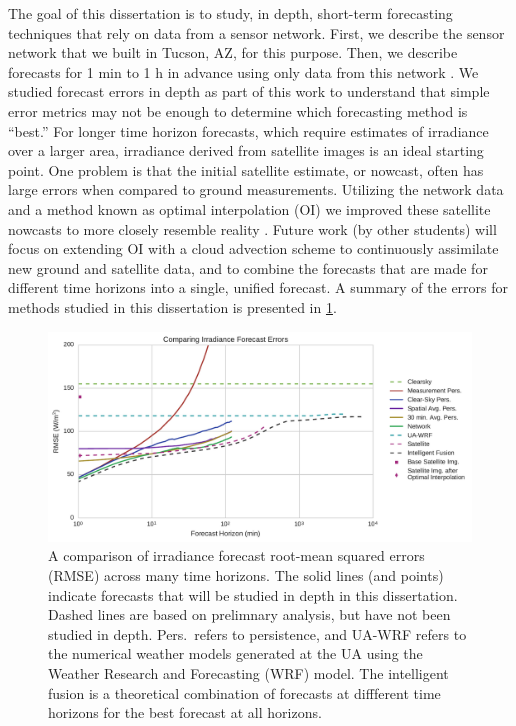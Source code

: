 \documentclass[12pt,letterpaper,notitlepage,openany]{article}
\begin{document}
The goal of this dissertation is to study, in depth, short-term
forecasting techniques that rely on data from a sensor network.
First, we describe the sensor network that we built in Tucson, AZ, for
this purpose.
Then, we describe forecasts for 1 min to 1 h in advance using only
data from this network \citep{Lorenzo2015c}.
We studied forecast errors in depth as part of this work to understand
that simple error metrics may not be enough to determine which
forecasting method is ``best.''
For longer time horizon forecasts, which require estimates of
irradiance over a larger area, irradiance derived from satellite
images is an ideal starting point.
One problem is that the initial satellite estimate, or nowcast, often
has large errors when compared to ground measurements.
Utilizing the network data and a method known as optimal interpolation
(OI) we improved these satellite nowcasts to more closely resemble
reality \citep{Lorenzo2017}.
Future work (by other students) will focus on extending OI with a
cloud advection scheme to continuously assimilate new ground and
satellite data, and to combine the forecasts that are made for
different time horizons into a single, unified forecast.
A summary of the errors for methods studied in this dissertation is
presented in \cref{fig:bullshitplot}.

\begin{figure}[h]
\includegraphics[width=\textwidth]{../dissertation/figs/timehorizon.pdf}
\caption[Irradiance forecast errors across forecast horizons]{A
  comparison of irradiance forecast root-mean squared errors (RMSE)
  across many time horizons. The solid lines (and points) indicate
  forecasts that will be studied in depth in this dissertation. Dashed
  lines are based on prelimnary analysis, but have not been studied in
  depth. Pers.\ refers to persistence, and UA-WRF refers to the
  numerical weather models generated at the UA using the Weather
  Research and Forecasting (WRF) model. The intelligent fusion is a
  theoretical combination of forecasts at diffferent time horizons for
  the best forecast at all horizons.}
\label{fig:bullshitplot}
\end{figure}
\end{document}
